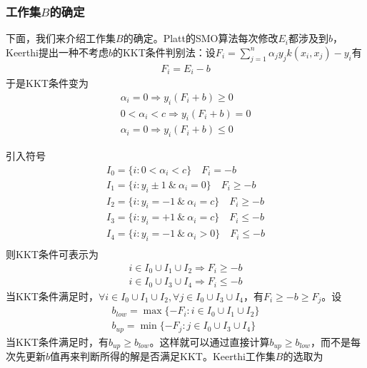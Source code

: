         \subsubsection{工作集$B$的确定}
            \par
            下面，我们来介绍工作集$B$的确定。Platt的SMO算法每次修改$E_i$都涉及到$b$，Keerthi提出一种不考虑$b$的KKT条件判别法：设$F_i = \sum_{j=1}^n\alpha_jy_j k(x_i,x_j)-y_i$有
            \begin{align*}
            F_i = E_i-b
            \end{align*}
            于是KKT条件变为
            \begin{align*}
            \alpha_i = 0 \Rightarrow y_i (F_i+b) \geqslant 0\\
            0<\alpha_i <c \Rightarrow y_i (F_i+b) = 0\\
            \alpha_i = 0 \Rightarrow y_i (F_i+b) \leqslant 0
            \end{align*}
            \par
            引入符号
            \begin{align*}
            I_0 = \{i:0<\alpha_i<c\} \quad F_i = -b\\
            I_1 = \{i:y_i \pm 1\ \& \ \alpha_i=0\} \quad F_i \geqslant -b\\
            I_2 = \{i:y_i = -1\ \&\ \alpha_i=c\} \quad F_i \geqslant -b\\
            I_3 = \{i:y_i = +1\ \&\ \alpha_i=c\} \quad F_i \leqslant -b\\
            I_4 = \{i:y_i=-1\ \&\ \alpha_i>0\} \quad F_i \leqslant -b\\
            \end{align*}
            则KKT条件可表示为
            \begin{align*}
            i\in I_0 \cup I_1\cup I_2 \Rightarrow F_i \geqslant -b\\
            i\in I_0 \cup I_3\cup I_4 \Rightarrow F_i \leqslant -b
            \end{align*}
            当KKT条件满足时，$\forall i\in I_0 \cup I_1\cup I_2, \forall j\in I_0\cup I_3\cup I_4$，有$F_i \geqslant -b \geqslant F_j$。设
            \begin{align*}
            b_{low} = \max\{-F_i:i\in I_0\cup I_1\cup I_2\}\\
            b_{up} = \min\{-F_j:j\in I_0\cup I_3\cup I_4\}
            \end{align*}
            当KKT条件满足时，有$b_{up} \geqslant b_{low}$。这样就可以通过直接计算$b_{up} \geqslant b_{low}$，而不是每次先更新$b$值再来判断所得的解是否满足KKT。Keerthi工作集$B$的选取为
